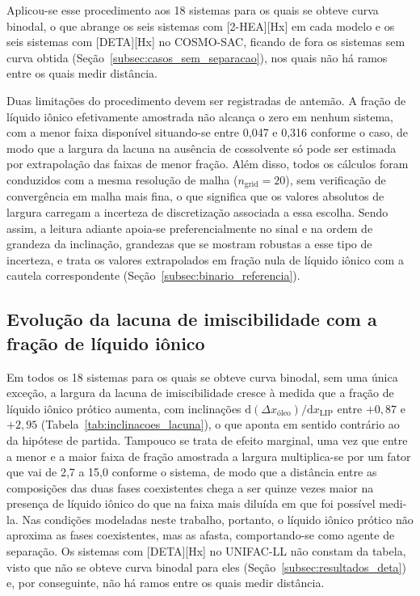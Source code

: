 Aplicou-se esse procedimento aos 18 sistemas para os quais se obteve curva binodal, o que abrange os seis sistemas com [2-HEA][Hx] em cada modelo e os seis sistemas com [DETA][Hx] no COSMO-SAC, ficando de fora os sistemas sem curva obtida (Seção~\ref{subsec:casos_sem_separacao}), nos quais não há ramos entre os quais medir distância.

Duas limitações do procedimento devem ser registradas de antemão. A fração de líquido iônico efetivamente amostrada não alcança o zero em nenhum sistema, com a menor faixa disponível situando-se entre 0,047 e 0,316 conforme o caso, de modo que a largura da lacuna na ausência de cossolvente só pode ser estimada por extrapolação das faixas de menor fração. Além disso, todos os cálculos foram conduzidos com a mesma resolução de malha ($n_{\text{grid}} = 20$), sem verificação de convergência em malha mais fina, o que significa que os valores absolutos de largura carregam a incerteza de discretização associada a essa escolha. Sendo assim, a leitura adiante apoia-se preferencialmente no sinal e na ordem de grandeza da inclinação, grandezas que se mostram robustas a esse tipo de incerteza, e trata os valores extrapolados em fração nula de líquido iônico com a cautela correspondente (Seção~\ref{subsec:binario_referencia}).

\subsection{Evolução da lacuna de imiscibilidade com a fração de líquido iônico}
\label{subsec:evolucao_lacuna}

Em todos os 18 sistemas para os quais se obteve curva binodal, sem uma única exceção, a largura da lacuna de imiscibilidade cresce à medida que a fração de líquido iônico prótico aumenta, com inclinações $\mathrm{d}(\Delta x_{\text{óleo}})/\mathrm{d}x_{\text{LIP}}$ entre $+0{,}87$ e $+2{,}95$ (Tabela~\ref{tab:inclinacoes_lacuna}), o que aponta em sentido contrário ao da hipótese de partida. Tampouco se trata de efeito marginal, uma vez que entre a menor e a maior faixa de fração amostrada a largura multiplica-se por um fator que vai de 2,7 a 15,0 conforme o sistema, de modo que a distância entre as composições das duas fases coexistentes chega a ser quinze vezes maior na presença de líquido iônico do que na faixa mais diluída em que foi possível medi-la. Nas condições modeladas neste trabalho, portanto, o líquido iônico prótico não aproxima as fases coexistentes, mas as afasta, comportando-se como agente de separação. Os sistemas com [DETA][Hx] no UNIFAC-LL não constam da tabela, visto que não se obteve curva binodal para eles (Seção~\ref{subsec:resultados_deta}) e, por conseguinte, não há ramos entre os quais medir distância.

